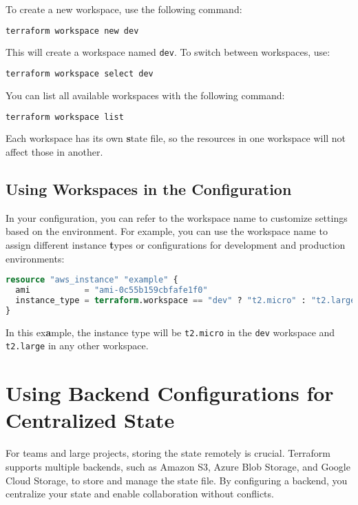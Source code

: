 To create a new workspace, use the following command:

\begin{lstlisting}[language=bash]
terraform workspace new dev
\end{lstlisting}

This will create a workspace named \texttt{dev}. To switch between workspaces, use:

\begin{lstlisting}[language=bash]
terraform workspace select dev
\end{lstlisting}

You can list all available workspaces with the following command:

\begin{lstlisting}[language=bash]
terraform workspace list
\end{lstlisting}

Each workspace has its own \textbf{s}tate file, so the resources in one workspace will not affect those in another.

\subsection{Using Workspaces in the Configuration}

In your configuration, you can refer to the workspace name to customize settings based on the environment. For example, you can use the workspace name to assign different instance \textbf{t}ypes or configurations for development and production environments:

\begin{lstlisting}[language=terraform]
resource "aws_instance" "example" {
  ami           = "ami-0c55b159cbfafe1f0"
  instance_type = terraform.workspace == "dev" ? "t2.micro" : "t2.large"
}
\end{lstlisting}

In this ex\textbf{a}mple, the instance type will be \texttt{t2.micro} in the \texttt{dev} workspace and \texttt{t2.large} in any other workspace.

\section{Using Backend Configurations for Centralized State}

For teams and large projects, storing the state remotely is crucial. Terraform supports multiple backends, such as Amazon S3, Azure Blob Storage, and Google Cloud Storage, to store and manage the state file. By configuring a backend, you centralize your state and enable collaboration without conflicts.

